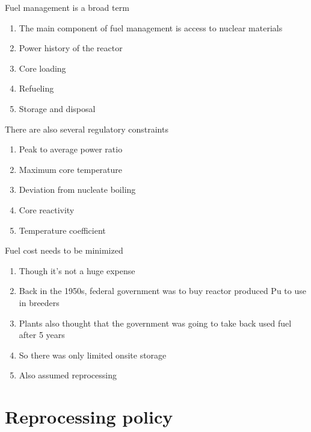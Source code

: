 \documentclass[aspectratio=1610,pdftex,dvipsnames,compress,xcolor={dvipsnames}]{beamer}
\begin{document}
\addtocounter{framenumber}{-1} 
\begin{frame}{Fuel management is a broad term}
    \begin{enumerate}[series=outerlist,topsep=0pt,itemsep=15pt,leftmargin=*,label=(\arabic*)]
        \item[]The main component of fuel management is access to nuclear materials
        \item[]Power history of the reactor
        \item[]Core loading
        \item[]Refueling
        \item[]Storage and disposal
    \end{enumerate}
\end{frame}


\begin{frame}{There are also several regulatory constraints}
    \begin{enumerate}[topsep=0pt,itemsep=21pt,leftmargin=*,label=(\arabic*)]
        \item[]Peak to average power ratio
        \item[]Maximum core temperature
        \item[]Deviation from nucleate boiling
        \item[]Core reactivity
        \item[]Temperature coefficient 
    \end{enumerate}
\end{frame}


\begin{frame}{Fuel cost needs to be minimized}
    \begin{enumerate}[series=outerlist,topsep=0pt,itemsep=21pt,leftmargin=*,label=(\arabic*)]
        \item[]Though it's not a huge expense
        \item[]Back in the 1950s, federal government was to buy reactor produced Pu to use in breeders
        \item[]Plants also thought that the government was going to take back used fuel after 5 years
        \item[]So there was only limited onsite storage
        \item[]Also assumed reprocessing
    \end{enumerate}
\end{frame}


\section{Reprocessing policy}
\end{document}
